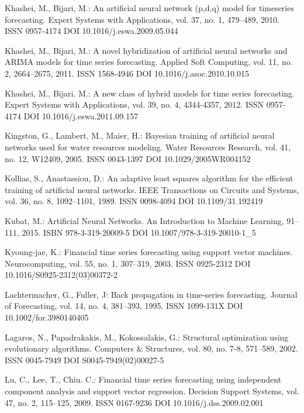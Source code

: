 \begin{thebibliography}{99.}
 Khashei, M., Bijari, M.: An artificial neural network (p,d,q) model for timeseries forecasting. Expert Systems with Applications, vol. 37, no. 1, 479--489, 2010. ISSN 0957-4174 DOI 10.1016/j.eswa.2009.05.044

 Khashei, M., Bijari, M.: A novel hybridization of artificial neural networks and ARIMA models for time series forecasting. Applied Soft Computing, vol. 11, no. 2, 2664--2675, 2011. ISSN 1568-4946 DOI 10.1016/j.asoc.2010.10.015

 Khashei, M., Bijari. M.: A new class of hybrid models for time series forecasting. Expert Systems with Applications, vol. 39, no. 4, 4344-4357, 2012. ISSN 0957-4174 DOI 10.1016/j.eswa.2011.09.157

 Kingston, G., Lambert, M., Maier, H.: Bayesian training of artificial neural networks used for water resources modeling. Water Resources Research, vol. 41, no. 12, W12409, 2005. ISSN 0043-1397 DOI 10.1029/2005WR004152

 Kollias, S., Anastassiou, D.: An adaptive least squares algorithm for the efficient training of artificial neural networks. IEEE Transactions on Circuits and Systems, vol. 36, no. 8, 1092--1101, 1989. ISSN 0098-4094 DOI 10.1109/31.192419

 Kubat, M.: Artificial Neural Networks. An Introduction to Machine Learning, 91--111, 2015. ISBN 978-3-319-20009-5 DOI 10.1007/978-3-319-20010-1\_5

 Kyoung-jae, K.: Financial time series forecasting using support vector machines. Neurocomputing, vol. 55, no. 1, 307--319, 2003. ISSN 0925-2312 DOI 10.1016/S0925-2312(03)00372-2

 Lachtermacher, G., Fuller, J: Back propagation in time-series forecasting. Journal of Forecasting, vol. 14, no. 4, 381--393, 1995. ISSN 1099-131X DOI 10.1002/for.3980140405

 Lagaros, N., Papadrakakis, M., Kokossalakis, G.: Structural optimization using evolutionary algorithms. Computers \& Structures, vol. 80, no. 7-8, 571--589, 2002. ISSN 0045-7949 DOI S0045-7949(02)00027-5

 Lu, C., Lee, T., Chiu. C.: Financial time series forecasting using independent component analysis and support vector regression. Decision Support Systems, vol. 47, no. 2, 115--125, 2009. ISSN 0167-9236 DOI 10.1016/j.dss.2009.02.001


\end{thebibliography}
